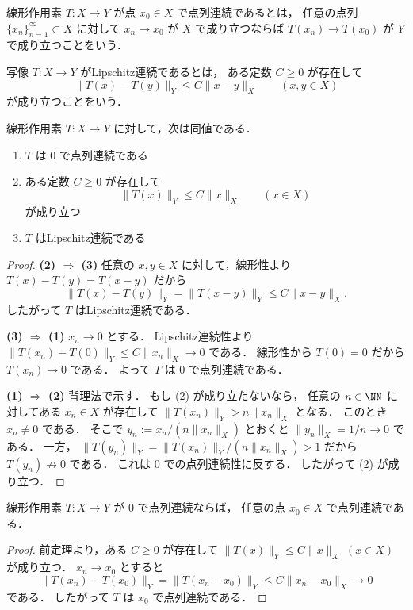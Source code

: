 \begin{definition}[点列連続]
線形作用素 $T:X\to Y$ が点 $x_0\in X$ で点列連続であるとは，
任意の点列 $\{x_n\}_{n=1}^{\infty}\subset X$ に対して
$x_n\to x_0$ が $X$ で成り立つならば $T(x_n)\to T(x_0)$ が $Y$ で成り立つことをいう．
\end{definition}

\begin{definition}[Lipschitz連続]
写像 $T:X\to Y$ がLipschitz連続であるとは，
ある定数 $C\ge 0$ が存在して
\[
\|T(x)-T(y)\|_Y\le C\|x-y\|_X
\qquad (x,y\in X)
\]
が成り立つことをいう．
\end{definition}

\begin{theorem}[線形作用素の連続性の判定]
線形作用素 $T:X\to Y$ に対して，次は同値である．
\begin{enumerate}
    \item $T$ は $0$ で点列連続である
    \item ある定数 $C\ge 0$ が存在して
    \[
    \|T(x)\|_Y\le C\|x\|_X
    \qquad (x\in X)
    \]
    が成り立つ
    \item $T$ はLipschitz連続である
\end{enumerate}
\end{theorem}
\begin{proof}
\textbf{(2) $\Rightarrow$ (3)}\quad
任意の $x,y\in X$ に対して，線形性より
$T(x)-T(y)=T(x-y)$ だから
\[
\|T(x)-T(y)\|_Y
=
\|T(x-y)\|_Y
\le
C\|x-y\|_X.
\]
したがって $T$ はLipschitz連続である．

\textbf{(3) $\Rightarrow$ (1)}\quad
$x_n\to 0$ とする．
Lipschitz連続性より
$\|T(x_n)-T(0)\|_Y\le C\|x_n\|_X\to 0$ である．
線形性から $T(0)=0$ だから
$T(x_n)\to 0$ である．
よって $T$ は $0$ で点列連続である．

\textbf{(1) $\Rightarrow$ (2)}\quad
背理法で示す．
もし (2) が成り立たないなら，
任意の $n\in\NN$ に対してある $x_n\in X$ が存在して
$\|T(x_n)\|_Y>n\|x_n\|_X$ となる．
このとき $x_n\ne 0$ である．
そこで
$y_n:=x_n/(n\|x_n\|_X)$ とおくと $\|y_n\|_X=1/n\to 0$ である．
一方，
$\|T(y_n)\|_Y=\|T(x_n)\|_Y/(n\|x_n\|_X)>1$ だから
$T(y_n)\not\to 0$ である．
これは $0$ での点列連続性に反する．
したがって (2) が成り立つ．
\end{proof}

\begin{corollary}
線形作用素 $T:X\to Y$ が $0$ で点列連続ならば，
任意の点 $x_0\in X$ で点列連続である．
\end{corollary}
\begin{proof}
前定理より，ある $C\ge 0$ が存在して
$\|T(x)\|_Y\le C\|x\|_X$ $(x\in X)$ が成り立つ．
$x_n\to x_0$ とすると
\[
\|T(x_n)-T(x_0)\|_Y
=
\|T(x_n-x_0)\|_Y
\le
C\|x_n-x_0\|_X\to 0
\]
である．
したがって $T$ は $x_0$ で点列連続である．
\end{proof}

